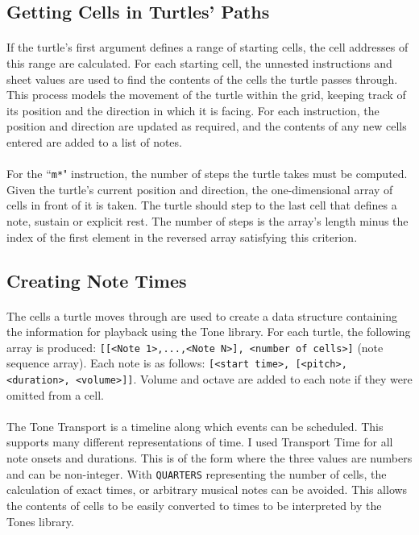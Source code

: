 \subsection{Getting Cells in Turtles' Paths}

\paragraph{} If the turtle's first argument defines a range of starting cells, the cell addresses of this range are calculated. For each starting cell, the unnested instructions and sheet values are used to find the contents of the cells the turtle passes through. This process models the movement of the turtle within the grid, keeping track of its position and the direction in which it is facing. For each instruction, the position and direction are updated as required, and the contents of any new cells entered are added to a list of notes.

\paragraph{} For the ``\texttt{m*}" instruction, the number of steps the turtle takes must be computed. Given the turtle's current position and direction, the one-dimensional array of cells in front of it is taken. The turtle should step to the last cell that defines a note, sustain or explicit rest. The number of steps is the array's length minus the index of the first element in the reversed array satisfying this criterion.

\subsection{Creating Note Times}

\paragraph{} The cells a turtle moves through are used to create a data structure containing the information for playback using the Tone library. For each turtle, the following array is produced: \texttt{[[<Note 1>,...,<Note N>], <number of cells>]} (note sequence array). Each note is as follows: \texttt{[<start time>, [<pitch>, <duration>, <volume>]]}. Volume and octave are added to each note if they were omitted from a cell.

\paragraph{} The Tone Transport is a timeline along which events can be scheduled. This supports many different representations of time. I used Transport Time for all note onsets and durations. This is of the form \texttt{} where the three values are numbers and can be non-integer. With \texttt{QUARTERS} representing the number of cells, the calculation of exact times, or arbitrary musical notes can be avoided. This allows the contents of cells to be easily converted to times to be interpreted by the Tones library.


